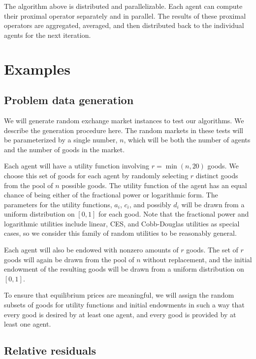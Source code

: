 \documentclass[12pt]{article}
\begin{document}
The algorithm above is distributed and parallelizable. Each agent can compute
their proximal operator separately and in parallel. The results of these
proximal operators are aggregated, averaged, and then distributed back to the
individual agents for the next iteration.


\section{Examples}
\label{sec:examples}
\subsection{Problem data generation}
\label{sec:random_prob}


We will generate random exchange market instances to test our algorithms. We
describe the generation procedure here. The random markets in these tests will
be parameterized by a single number, $n$, which will be both the number of
agents and the number of goods in the market.

Each agent will have a utility function involving $r = \min(n,20)$ goods. We
choose this set of goods for each agent by randomly selecting $r$ distinct
goods from the pool of $n$ possible goods. The utility function of the agent
has an equal chance of  being either of the fractional power or logarithmic
form. The parameters for the utility functions, $a_i$, $c_i$, and possibly
$d_i$ will be drawn from a uniform distribution on $[0,1]$ for each good. Note
that the fractional power and logarithmic utilities include linear, CES, and
Cobb-Douglas utilities as special cases, so we consider this family of random
utilities to be reasonably general.

Each agent will also be endowed with nonzero amounts of $r$ goods. The set of
$r$ goods will again be drawn from the pool of $n$ without replacement, and the
initial endowment of the resulting goods will be drawn from a uniform
distribution on $[0,1]$.

To ensure that equilibrium prices are meaningful, we will assign the random
subsets of goods for utility functions and initial endowments in such a way
that every good is desired by at least one agent, and every good is provided by
at least one agent.

\subsection{Relative residuals}
\end{document}
